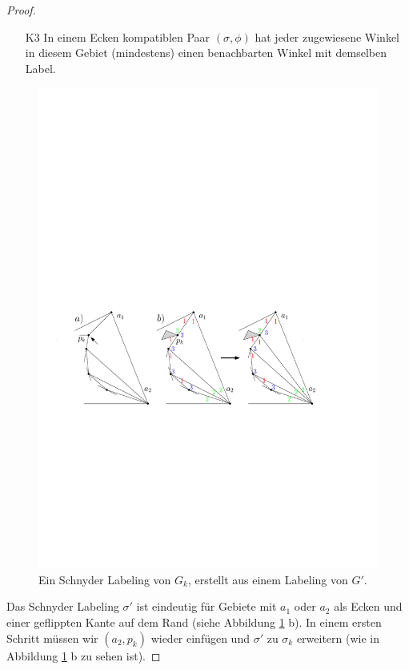\begin{proof}
\begin{itemize} 
\item [K3] In einem Ecken kompatiblen Paar $(\sigma,\phi)$ hat jeder zugewiesene Winkel in diesem Gebiet (mindestens) einen benachbarten Winkel mit demselben Label.
\end{itemize}

\begin{figure}
	\centering
	  \includegraphics[width=1\textwidth]{lem6_3.pdf}
    	\caption{Ein Schnyder Labeling von $G_k$, erstellt aus einem Labeling von $G'$. }
    	\label{pic_lem6_3}
\end{figure}

Das Schnyder Labeling $\sigma'$ ist eindeutig für Gebiete mit $a_1$ oder $a_2$ als Ecken und einer geflippten Kante auf dem Rand (siehe Abbildung \ref{pic_lem6_3} b). In einem ersten Schritt müssen wir $(a_2,p_k)$ wieder einfügen und $\sigma'$ zu $\sigma_k$ erweitern (wie in Abbildung \ref{pic_lem6_3} b zu sehen ist).


\end{proof}

